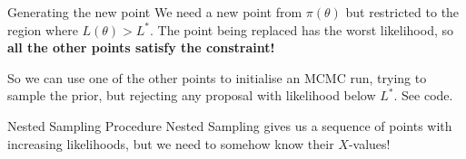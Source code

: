 \begin{frame}[t]{Generating the new point}
We need a new point from $\pi(\theta)$ but restricted to the region where $L(\theta)>L^*$. The point being replaced has the worst likelihood, so
{\bf all the other points satisfy the constraint!}
\vspace{20pt}

So we can use one of the other points to initialise an MCMC run, trying to
sample the prior, but rejecting any proposal with likelihood below $L^*$.
See code.
\end{frame}


\begin{frame}{Nested Sampling Procedure}
Nested Sampling gives us a sequence of points with increasing likelihoods,
but we need to somehow know their $X$-values!
\end{frame}



